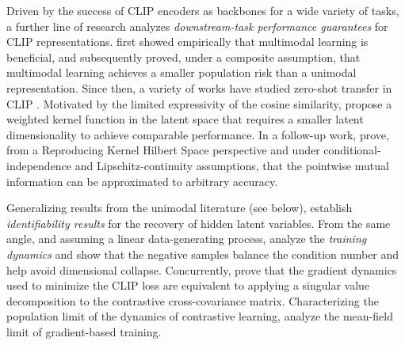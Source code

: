 \documentclass{article}
\begin{document}
Driven by the success of CLIP encoders as backbones for a wide variety of
tasks, a further line of research analyzes \emph{downstream-task
 performance guarantees} for CLIP representations.
\cite{tianContrastiveMultiviewCoding2020a} first showed empirically that
multimodal learning is beneficial, and \cite{huangWhatMakesMultiModal2021}
subsequently proved, under a composite assumption, that multimodal learning
achieves a smaller population risk than a unimodal representation. Since
then, a variety of works have studied zero-shot transfer in CLIP
\citep{chenUnderstandingTransferableRepresentation2023,
 mayilvahananDoesCLIPsGeneralization2023, uesakaWeightedPointSet2024,
 okoStatisticalTheoryContrastive2025,
 liStatisticalConsistencyGeneralization2026}. Motivated by the limited
expressivity of the cosine similarity, \cite{uesakaWeightedPointSet2024}
propose a weighted kernel function in the latent space that requires a
smaller latent dimensionality to achieve comparable performance. In a
follow-up work, \cite{yoshidaTheoreticalRefinementCLIP2025} prove, from a
Reproducing Kernel Hilbert Space perspective and under
conditional-independence and Lipschitz-continuity assumptions, that the
pointwise mutual information can be approximated to arbitrary accuracy.

Generalizing results from the unimodal literature (see below),
\cite{daunhawerIdentifiabilityResultsMultimodal2022} establish
\emph{identifiability results} for the recovery of hidden latent variables.
From the same angle, and assuming a linear data-generating process,
\cite{renImportanceContrastiveLoss2023} analyze the \emph{training
 dynamics} and show that the negative samples balance the condition number
and help avoid dimensional collapse. Concurrently,
\cite{nakadaUnderstandingMultimodalContrastive2023} prove that the gradient
dynamics used to minimize the CLIP loss are equivalent to applying a
singular value decomposition to the contrastive cross-covariance matrix.
Characterizing the population limit of the dynamics of contrastive
learning, \citep{furusawaMeanFieldTheory2023a,
 mengTrainingDynamicsNonlinear2024} analyze the mean-field limit of
gradient-based training.
\end{document}
